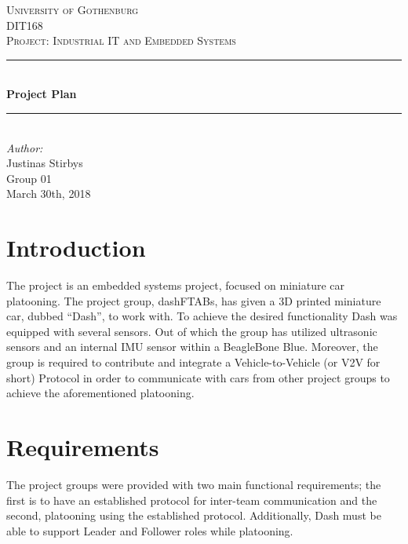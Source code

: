\documentclass[12pt]{article}
\begin{document}
\begin{titlepage}

\newcommand{\Line}{\rule{\linewidth}{0.5mm}} 

\center
 
\textsc{\LARGE University of Gothenburg}
\\[3.5cm] 

\textsc{\Large DIT168}\\[0.3cm]
\textsc{\large Project: Industrial IT and Embedded Systems}\\[0.5cm]

\Line \\[0.4cm]
{\huge \bfseries Project Plan}\\[0.4cm]
\Line \\[0.5cm]
 
\Large \textit{Author:}
\\Justinas Stirbys \\[7cm]

{\large Group 01} \\[0.3cm]
{\large March 30th, 2018}

\vfill

\end{titlepage}

\tableofcontents

\section{Introduction} 
The project is an embedded systems project, focused on miniature car platooning. The project group, dashFTABs, has given a 3D printed miniature car, dubbed “Dash”, to work with. To achieve the desired functionality Dash was equipped with several sensors. Out of which the group has utilized ultrasonic sensors and an internal IMU sensor within a BeagleBone Blue. Moreover, the group is required to contribute and integrate a Vehicle-to-Vehicle (or V2V for short) Protocol in order to communicate with cars from other project groups to achieve the aforementioned platooning.

\section{Requirements}
The project groups were provided with two main functional requirements; the first is to have an established protocol for inter-team communication and the second, platooning using the established protocol. Additionally, Dash must be able to support Leader and Follower roles while platooning. \par
\end{document}
